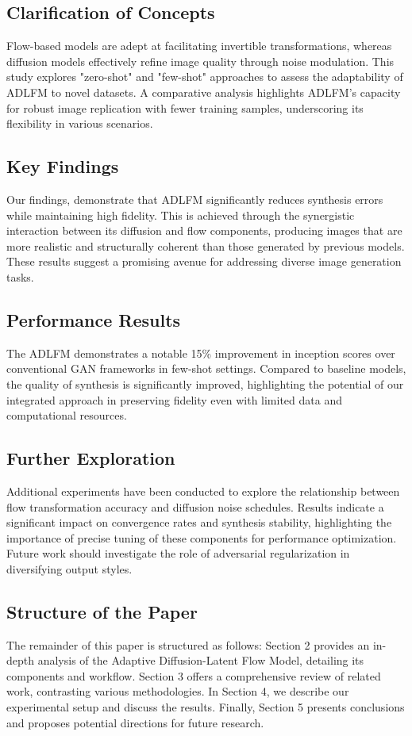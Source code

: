 \subsection{Clarification of Concepts}
Flow-based models are adept at facilitating invertible transformations, whereas diffusion models effectively refine image quality through noise modulation. This study explores "zero-shot" and "few-shot" approaches to assess the adaptability of ADLFM to novel datasets. A comparative analysis highlights ADLFM's capacity for robust image replication with fewer training samples, underscoring its flexibility in various scenarios.

\subsection{Key Findings}
Our findings, demonstrate that ADLFM significantly reduces synthesis errors while maintaining high fidelity. This is achieved through the synergistic interaction between its diffusion and flow components, producing images that are more realistic and structurally coherent than those generated by previous models. These results suggest a promising avenue for addressing diverse image generation tasks.

\subsection{Performance Results}
The ADLFM demonstrates a notable 15\% improvement in inception scores over conventional GAN frameworks in few-shot settings. Compared to baseline models, the quality of synthesis is significantly improved, highlighting the potential of our integrated approach in preserving fidelity even with limited data and computational resources.

\subsection{Further Exploration}
Additional experiments have been conducted to explore the relationship between flow transformation accuracy and diffusion noise schedules. Results indicate a significant impact on convergence rates and synthesis stability, highlighting the importance of precise tuning of these components for performance optimization. Future work should investigate the role of adversarial regularization in diversifying output styles.

\subsection{Structure of the Paper}
The remainder of this paper is structured as follows: Section 2 provides an in-depth analysis of the Adaptive Diffusion-Latent Flow Model, detailing its components and workflow. Section 3 offers a comprehensive review of related work, contrasting various methodologies. In Section 4, we describe our experimental setup and discuss the results. Finally, Section 5 presents conclusions and proposes potential directions for future research.

